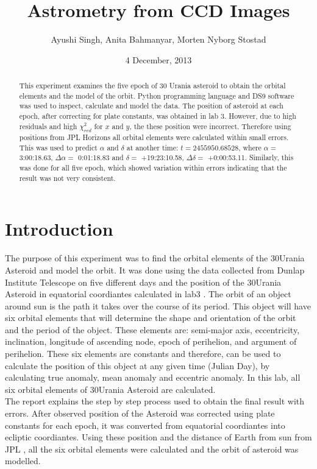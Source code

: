 \documentclass[a4paper,12pt]{article}
\makeatletter
\newcommand{\myemail}{ayushi.singh@mail.utoronto.ca}
\newcommand{\anita}{anita.bahmanyar@mail.utoronto.ca}
\newcommand{\carly}{c.berard@mail.utoronot.ca}
\makeatother
\begin{document}
\onehalfspacing
\title{Astrometry from CCD Images}
\author{Ayushi Singh, Anita Bahmanyar, Morten Nyborg Stostad}
\affil{\small {\myemail}}%
\date{4 December, 2013}
\maketitle

\begin{abstract}
\label{abstract}
This experiment examines the five epoch of 30 Urania asteroid to obtain the orbital elements and the model of the orbit. Python programming language and DS9 software was used to inspect, calculate and model the data. The position of asteroid at each epoch, after correcting for plate constants, was obtained in lab 3. However, due to high residuals and high $\chi_{red}^{2}$ for $x$ and $y$, the these position were incorrect. Therefore using positions from JPL Horizons all orbital elements were calculated within small errors. This was used to predict $\alpha$ and $\delta$ at another time: $t = 2455950.68528$, where $\alpha =$ 3:00:18.63, $\Delta\alpha =$ 0:01:18.83 and $\delta =$ +19:23:10.58, $\Delta\delta =$ +0:00:53.11. Similarly, this was done for all five epoch, which showed variation within errors indicating that the result was not very consistent. 

\end{abstract}

\section{Introduction}
\label{sec:introduction} 
The purpose of this experiment was to find the orbital elements of the 30Urania Asteroid and model the orbit. It was done using the data collected from Dunlap Institute Telescope on five different days and the position of the 30Urania Asteroid in equatorial coordiantes calculated in lab3 \cite{lab3}. The orbit of an object around sun is the path it takes over the course of its period. This object will have six orbital elements that will determine the shape and orientation of the orbit and the period of the object. These elements are: semi-major axis, eccentricity, inclination, longitude of ascending node, epoch of perihelion, and argument of perihelion. These six elements are constants and therefore, can be used to calculate the position of this object at any given time (Julian Day), by calculating true anomaly, mean anomaly and eccentric anomaly. In this lab, all six orbital elements of 30Urania Asteroid are calculated.\\
\indent The report explains the step by step process used to obtain the final result with errors. After observed position of the Asteroid was corrected using plate constants for each epoch, it was converted from equatorial coordiantes into ecliptic coordiantes. Using these position and the distance of Earth from sun from JPL \cite{jpl}, all the six orbital elements were calculated and the orbit of asteroid was modelled.   
\end{document}
